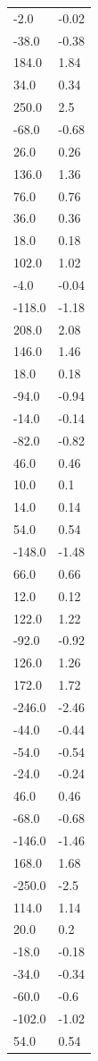 \begin{longtable}{ll}
-2.0 & -0.02 \\
-38.0 & -0.38 \\
184.0 & 1.84 \\
34.0 & 0.34 \\
250.0 & 2.5 \\
-68.0 & -0.68 \\
26.0 & 0.26 \\
136.0 & 1.36 \\
76.0 & 0.76 \\
36.0 & 0.36 \\
18.0 & 0.18 \\
102.0 & 1.02 \\
-4.0 & -0.04 \\
-118.0 & -1.18 \\
208.0 & 2.08 \\
146.0 & 1.46 \\
18.0 & 0.18 \\
-94.0 & -0.94 \\
-14.0 & -0.14 \\
-82.0 & -0.82 \\
46.0 & 0.46 \\
10.0 & 0.1 \\
14.0 & 0.14 \\
54.0 & 0.54 \\
-148.0 & -1.48 \\
66.0 & 0.66 \\
12.0 & 0.12 \\
122.0 & 1.22 \\
-92.0 & -0.92 \\
126.0 & 1.26 \\
172.0 & 1.72 \\
-246.0 & -2.46 \\
-44.0 & -0.44 \\
-54.0 & -0.54 \\
-24.0 & -0.24 \\
46.0 & 0.46 \\
-68.0 & -0.68 \\
-146.0 & -1.46 \\
168.0 & 1.68 \\
-250.0 & -2.5 \\
114.0 & 1.14 \\
20.0 & 0.2 \\
-18.0 & -0.18 \\
-34.0 & -0.34 \\
-60.0 & -0.6 \\
-102.0 & -1.02 \\
54.0 & 0.54 \\

\end{longtable}
